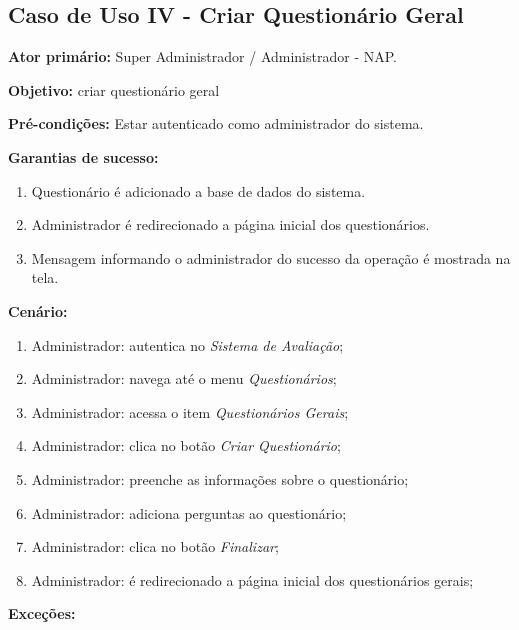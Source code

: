 \documentclass[
  12pt,       %
  openright,      %
  oneside,      %
  a4paper,      %
  english,      %
  french,        %
  spanish,     %
  brazil        %
  ]{abntex2-decsi}
\begin{document}
\begin{apendicesenv}
    \newpage
    
    \section{Caso de Uso IV - Criar Questionário Geral}
    
      \textbf{Ator primário:} Super Administrador / Administrador - NAP.

      \textbf{Objetivo:} criar questionário geral

      \textbf{Pré-condições:} Estar autenticado como administrador do sistema.

      \textbf{Garantias de sucesso:} 

              \begin{enumerate}

              \item Questionário é adicionado a base de dados do sistema.  
              \item Administrador é redirecionado a página inicial dos questionários.
              \item Mensagem informando o administrador do sucesso da operação é mostrada na tela.

              \end{enumerate}

          \textbf{Cenário:}

          \begin{enumerate}
              \item Administrador: autentica no \textit{Sistema de Avaliação};
              \item Administrador: navega até o menu \textit{Questionários};
              \item Administrador: acessa o item \textit{Questionários Gerais};
              \item Administrador: clica no botão \textit{Criar Questionário};
              \item Administrador: preenche as informações sobre o questionário;
              \item Administrador: adiciona perguntas ao questionário;
              \item Administrador: clica no botão \textit{Finalizar};
              \item Administrador: é redirecionado a página inicial dos questionários gerais;
          \end{enumerate}

          \textbf{Exceções:}


\end{apendicesenv}
\end{document}
